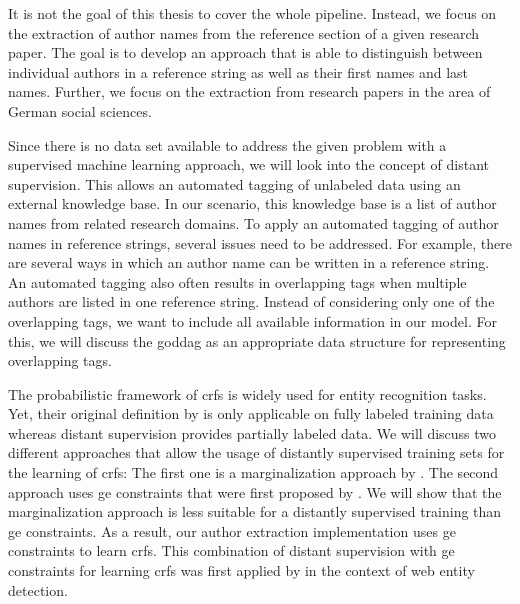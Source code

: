 It is not the goal of this thesis to cover the whole pipeline.
Instead, we focus on the extraction of author names from the reference section of a given research paper.
The goal is to develop an approach that is able to distinguish between individual authors in a reference string as well as their first names and last names.
Further, we focus on the extraction from research papers in the area of German social sciences.

\bigskip

Since there is no data set available to address the given problem with a supervised machine learning approach, we will look into the concept of distant supervision.
This allows an automated tagging of unlabeled data using an external knowledge base.
In our scenario, this knowledge base is a list of author names from related research domains.
To apply an automated tagging of author names in reference strings, several issues need to be addressed.
For example, there are several ways in which an author name can be written in a reference string.
An automated tagging also often results in overlapping tags when multiple authors are listed in one reference string.
Instead of considering only one of the overlapping tags, we want to include all available information in our model.
For this, we will discuss the \gls{goddag} as an appropriate data structure for representing overlapping tags.

The probabilistic framework of \glspl{crf} is widely used for entity recognition tasks.
Yet, their original definition by \citet{lafferty2001conditional} is only applicable on fully labeled training data whereas distant supervision provides partially labeled data.
We will discuss two different approaches that allow the usage of distantly supervised training sets for the learning of \glspl{crf}:
The first one is a marginalization approach by \citet{tsuboi2008training}.
The second approach uses \gls{ge} constraints that were first proposed by \citet{mann2007simple}.
We will show that the marginalization approach is less suitable for a distantly supervised training than \gls{ge} constraints.
As a result, our author extraction implementation uses \gls{ge} constraints to learn \glspl{crf}.
This combination of distant supervision with \gls{ge} constraints for learning \glspl{crf} was first applied by \citet{lu2013web} in the context of web entity detection.

\bigskip

